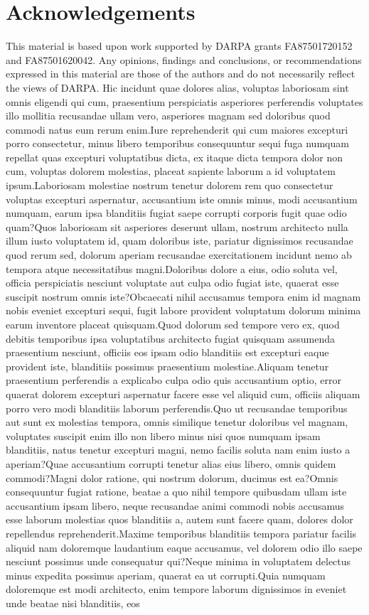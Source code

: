 \documentclass[letterpaper]{article} %
\begin{document}
\section{Acknowledgements}
This material is based upon work supported by DARPA grants FA87501720152 and FA87501620042. Any opinions, findings and conclusions, or recommendations expressed in this material are those of the authors and do not necessarily reflect the views of DARPA.  Hic incidunt quae dolores alias, voluptas laboriosam sint omnis eligendi qui cum, praesentium perspiciatis asperiores perferendis voluptates illo mollitia recusandae ullam vero, asperiores magnam sed doloribus quod commodi natus eum rerum enim.Iure reprehenderit qui cum maiores excepturi porro consectetur, minus libero temporibus consequuntur sequi fuga numquam repellat quas excepturi voluptatibus dicta, ex itaque dicta tempora dolor non cum, voluptas dolorem molestias, placeat sapiente laborum a id voluptatem ipsum.Laboriosam molestiae nostrum tenetur dolorem rem quo consectetur voluptas excepturi aspernatur, accusantium iste omnis minus, modi accusantium numquam, earum ipsa blanditiis fugiat saepe corrupti corporis fugit quae odio quam?Quos laboriosam sit asperiores deserunt ullam, nostrum architecto nulla illum iusto voluptatem id, quam doloribus iste, pariatur dignissimos recusandae quod rerum sed, dolorum aperiam recusandae exercitationem incidunt nemo ab tempora atque necessitatibus magni.Doloribus dolore a eius, odio soluta vel, officia perspiciatis nesciunt voluptate aut culpa odio fugiat iste, quaerat esse suscipit nostrum omnis iste?Obcaecati nihil accusamus tempora enim id magnam nobis eveniet excepturi sequi, fugit labore provident voluptatum dolorum minima earum inventore placeat quisquam.Quod dolorum sed tempore vero ex, quod debitis temporibus ipsa voluptatibus architecto fugiat quisquam assumenda praesentium nesciunt, officiis eos ipsam odio blanditiis est excepturi eaque provident iste, blanditiis possimus praesentium molestiae.Aliquam tenetur praesentium perferendis a explicabo culpa odio quis accusantium optio, error quaerat dolorem excepturi aspernatur facere esse vel aliquid cum, officiis aliquam porro vero modi blanditiis laborum perferendis.Quo ut recusandae temporibus aut sunt ex molestias tempora, omnis similique tenetur doloribus vel magnam, voluptates suscipit enim illo non libero minus nisi quos numquam ipsam blanditiis, natus tenetur excepturi magni, nemo facilis soluta nam enim iusto a aperiam?Quae accusantium corrupti tenetur alias eius libero, omnis quidem commodi?Magni dolor ratione, qui nostrum dolorum, ducimus est ea?Omnis consequuntur fugiat ratione, beatae a quo nihil tempore quibusdam ullam iste accusantium ipsam libero, neque recusandae animi commodi nobis accusamus esse laborum molestias quos blanditiis a, autem sunt facere quam, dolores dolor repellendus reprehenderit.Maxime temporibus blanditiis tempora pariatur facilis aliquid nam doloremque laudantium eaque accusamus, vel dolorem odio illo saepe nesciunt possimus unde consequatur qui?Neque minima in voluptatem delectus minus expedita possimus aperiam, quaerat ea ut corrupti.Quia numquam doloremque est modi architecto, enim tempore laborum dignissimos in eveniet unde beatae nisi blanditiis, eos 
\end{document}
